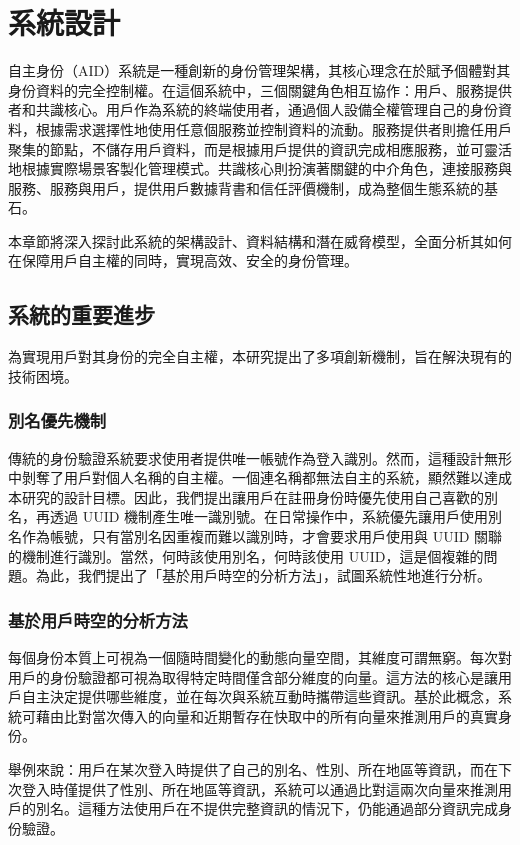 
\chapter{系統設計}
自主身份（AID）系統是一種創新的身份管理架構，其核心理念在於賦予個體對其身份資料的完全控制權。在這個系統中，三個關鍵角色相互協作：用戶、服務提供者和共識核心。用戶作為系統的終端使用者，通過個人設備全權管理自己的身份資料，根據需求選擇性地使用任意個服務並控制資料的流動。服務提供者則擔任用戶聚集的節點，不儲存用戶資料，而是根據用戶提供的資訊完成相應服務，並可靈活地根據實際場景客製化管理模式。共識核心則扮演著關鍵的中介角色，連接服務與服務、服務與用戶，提供用戶數據背書和信任評價機制，成為整個生態系統的基石。

本章節將深入探討此系統的架構設計、資料結構和潛在威脅模型，全面分析其如何在保障用戶自主權的同時，實現高效、安全的身份管理。
\section{系統的重要進步}
為實現用戶對其身份的完全自主權，本研究提出了多項創新機制，旨在解決現有的技術困境。
\subsection{別名優先機制}
傳統的身份驗證系統要求使用者提供唯一帳號作為登入識別。然而，這種設計無形中剝奪了用戶對個人名稱的自主權。一個連名稱都無法自主的系統，顯然難以達成本研究的設計目標。因此，我們提出讓用戶在註冊身份時優先使用自己喜歡的別名，再透過 UUID 機制\cite{uuid}產生唯一識別號。在日常操作中，系統優先讓用戶使用別名作為帳號，只有當別名因重複而難以識別時，才會要求用戶使用與 UUID 關聯的機制進行識別。當然，何時該使用別名，何時該使用 UUID，這是個複雜的問題。為此，我們提出了「基於用戶時空的分析方法」，試圖系統性地進行分析。
\subsection{基於用戶時空的分析方法}
每個身份本質上可視為一個隨時間變化的動態向量空間，其維度可謂無窮。每次對用戶的身份驗證都可視為取得特定時間僅含部分維度的向量。這方法的核心是讓用戶自主決定提供哪些維度，並在每次與系統互動時攜帶這些資訊。基於此概念，系統可藉由比對當次傳入的向量和近期暫存在快取中的所有向量來推測用戶的真實身份。

舉例來說：用戶在某次登入時提供了自己的別名、性別、所在地區等資訊，而在下次登入時僅提供了性別、所在地區等資訊，系統可以通過比對這兩次向量來推測用戶的別名。這種方法使用戶在不提供完整資訊的情況下，仍能通過部分資訊完成身份驗證。

